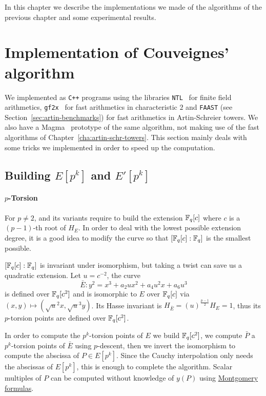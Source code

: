 In this chapter we describe the implementations we made of the
algorithms of the previous chapter and some experimental results.

\section{Implementation of Couveignes' algorithm}
\label{sec:implementation}

We implemented \ctwoasfimc{} as \texttt{C++} programs using the
libraries \texttt{NTL}~\cite{shoup2003ntl} for finite field
arithmetics, \texttt{gf2x}~\cite{gf2x} for fast arithmetics in
characteristic $2$ and \texttt{FAAST} (see
Section~\ref{sec:artin-benchmarks}) for fast arithmetics in
Artin-Schreier towers.  We also have a Magma~\cite{MAGMA} prototype of
the same algorithm, not making use of the fast algorithms of
Chapter~\ref{cha:artin-schr-towers}.  This section mainly deals with
some tricks we implemented in order to speed up the computation.

\subsection{Building \texorpdfstring{$E[p^k]$}{E[pk]} and \texorpdfstring{$E'[p^k]$}{E[pk]}}
\label{sec:impl:torsion}

\paragraph{$p$-Torsion}
For $p\ne2$, \ctwo{} and its variants require to build the extension
$\mathbb{F}_q[c]$ where $c$ is a $(p-1)$-th root of $H_E$. In order to deal with
the lowest possible extension degree, it is a good idea to modify the
curve so that $[\mathbb{F}_q[c]:\mathbb{F}_q]$ is the smallest possible.

$[\mathbb{F}_q[c]:\mathbb{F}_q]$ is invariant under isomorphism, but taking a twist
can save us a quadratic extension. Let $u=c^{-2}$, the curve
\begin{equation*}
  \bar{E} : y^2 = x^3 + a_2ux^2 + a_4u^2x + a_6u^3
\end{equation*}
is defined over $\mathbb{F}_q[c^2]$ and is isomorphic to $E$ over $\mathbb{F}_q[c]$
via $(x,y)\mapsto(\sqrt{u}^2x,\sqrt{u}^3y)$. Its Hasse invariant is
$H_{\bar{E}} = (u)^{\frac{p-1}{2}}H_E = 1$, thus its $p$-torsion
points are defined over $\mathbb{F}_q[c^2]$.

In order to compute the $p^k$-torsion points of $E$ we build
$\mathbb{F}_q[c^2]$, we compute $\bar{P}$ a $p^k$-torsion points of $\bar{E}$
using $p$-descent, then we invert the isomorphism to compute the
abscissa of $P\in E[p^k]$. Since the Cauchy interpolation only needs
the abscissas of $E[p^k]$, this is enough to complete the
algorithm. Scalar multiples of $P$ can be computed without knowledge
of $y(P)$ using \hyperref[rk:montgomery]{Montgomery formulas}.

